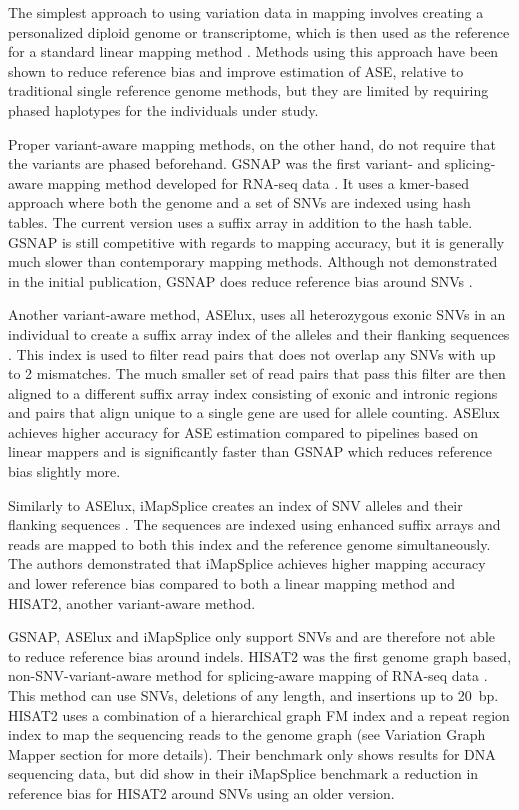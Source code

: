 The simplest approach to using variation data in mapping involves creating a personalized diploid genome or transcriptome, which is then used as the reference for a standard linear mapping method \cite{Turro2011-op,Rozowsky_2011,Bray_2016,Raghupathy2018-sd}.
Methods using this approach have been shown to reduce reference bias and improve estimation of ASE, relative to traditional single reference genome methods, but they are limited by requiring phased haplotypes for the individuals under study.

Proper variant-aware mapping methods, on the other hand, do not require that the variants are phased beforehand.
GSNAP was the first variant- and splicing-aware mapping method developed for RNA-seq data \cite{Wu2010-hv}.
It uses a kmer-based approach where both the genome and a set of SNVs are indexed using hash tables.
The current version uses a suffix array in addition to the hash table.
GSNAP is still competitive with regards to mapping accuracy, but it is generally much slower than contemporary mapping methods.
Although not demonstrated in the initial publication, GSNAP does reduce reference bias around SNVs \cite{Castel2015-ef}.

Another variant-aware method, ASElux, uses all heterozygous exonic SNVs in an individual to create a suffix array index of the alleles and their flanking sequences \cite{Miao2018-ps}. 
This index is used to filter read pairs that does not overlap any SNVs with up to 2 mismatches. 
The much smaller set of read pairs that pass this filter are then aligned to a different suffix array index consisting of exonic and intronic regions and pairs that align unique to a single gene are used for allele counting. 
ASElux achieves higher accuracy for ASE estimation compared to pipelines based on linear mappers and is significantly faster than GSNAP which reduces reference bias slightly more.

Similarly to ASElux, iMapSplice creates an index of SNV alleles and their flanking sequences \cite{Liu_2018}.
The sequences are indexed using enhanced suffix arrays and reads are mapped to both this index and the reference genome simultaneously.
The authors demonstrated that iMapSplice achieves higher mapping accuracy and lower reference bias compared to both a linear mapping method and HISAT2, another variant-aware method.

GSNAP, ASElux and iMapSplice only support SNVs and are therefore not able to reduce reference bias around indels.
HISAT2 was the first genome graph based, non-SNV-variant-aware method for splicing-aware mapping of RNA-seq data \cite{Kim_2019}. 
This method can use SNVs, deletions of any length, and insertions up to 20~bp.
HISAT2 uses a combination of a hierarchical graph FM index and a repeat region index to map the sequencing reads to the genome graph (see Variation Graph Mapper section for more details).
Their benchmark only shows results for DNA sequencing data, but \citeauthor{Liu_2018} did show in their iMapSplice benchmark a reduction in reference bias for HISAT2 around SNVs using an older version.  

